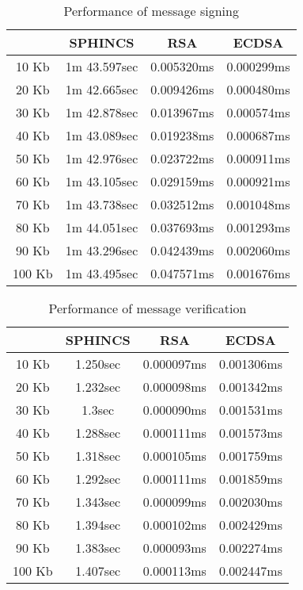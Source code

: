 \documentclass[]{scrartcl}
\begin{document}
\begin{table} [H]
	\centering
	\caption{Performance of message signing}
	\begin{tabular}{|c|c|c|c|}
		\hline 
		& SPHINCS & RSA & ECDSA \\ 
		\hline 
		10 Kb & 1m 43.597sec & 0.005320ms & 0.000299ms \\ 
		\hline 
		20 Kb & 1m 42.665sec & 0.009426ms & 0.000480ms \\ 
		\hline 
		30 Kb & 1m 42.878sec & 0.013967ms & 0.000574ms \\ 
		\hline 
		40 Kb & 1m 43.089sec & 0.019238ms & 0.000687ms \\ 
		\hline 
		50 Kb & 1m 42.976sec & 0.023722ms & 0.000911ms \\ 
		\hline 
		60 Kb & 1m 43.105sec & 0.029159ms & 0.000921ms \\ 
		\hline 
		70 Kb & 1m 43.738sec & 0.032512ms & 0.001048ms \\ 
		\hline 
		80 Kb & 1m 44.051sec & 0.037693ms & 0.001293ms \\ 
		\hline 
		90 Kb & 1m 43.296sec & 0.042439ms & 0.002060ms \\ 
		\hline 
		100 Kb & 1m 43.495sec & 0.047571ms & 0.001676ms \\ 
		\hline 
	\end{tabular} 
\end{table}

\begin{table} [H]
	\centering
	\caption{Performance of message verification}
	\begin{tabular}{|c|c|c|c|}
		\hline 
		& SPHINCS & RSA & ECDSA \\ 
		\hline 
		10 Kb & 1.250sec & 0.000097ms & 0.001306ms \\ 
		\hline 
		20 Kb & 1.232sec & 0.000098ms & 0.001342ms \\ 
		\hline 
		30 Kb & 1.3sec & 0.000090ms & 0.001531ms \\ 
		\hline 
		40 Kb & 1.288sec & 0.000111ms & 0.001573ms \\ 
		\hline 
		50 Kb & 1.318sec & 0.000105ms & 0.001759ms \\ 
		\hline 
		60 Kb & 1.292sec & 0.000111ms & 0.001859ms \\ 
		\hline 
		70 Kb & 1.343sec & 0.000099ms & 0.002030ms \\ 
		\hline 
		80 Kb & 1.394sec & 0.000102ms & 0.002429ms \\ 
		\hline 
		90 Kb & 1.383sec & 0.000093ms & 0.002274ms \\ 
		\hline 
		100 Kb & 1.407sec & 0.000113ms & 0.002447ms \\ 
		\hline 
	\end{tabular} 
\end{table}
\end{document}
